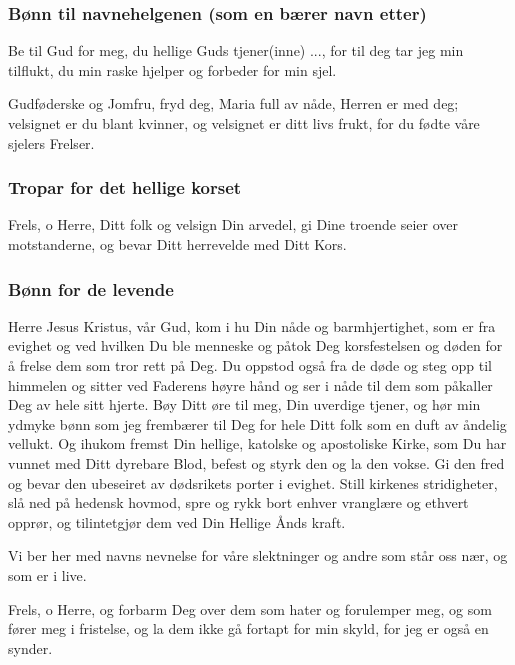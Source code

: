 \subsubsection{Bønn til navnehelgenen (som en bærer navn etter)}

Be til Gud for meg, du hellige Guds tjener(inne) ..., for til deg tar jeg min tilflukt, du min raske hjelper og forbeder for min sjel. 

Gudføderske og Jomfru, fryd deg, Maria full av nåde, Herren er med deg; velsignet er du blant kvinner, og velsignet er ditt livs frukt, for du fødte våre sjelers Frelser.

\subsubsection{Tropar for det hellige korset}

Frels, o Herre, Ditt folk og velsign Din arvedel, gi Dine troende seier over motstanderne, og bevar Ditt herrevelde med Ditt Kors.

\subsubsection{Bønn for de levende}

Herre Jesus Kristus, vår Gud, kom i hu Din nåde og barmhjertighet, som er fra evighet og ved hvilken Du ble menneske og påtok Deg korsfestelsen og døden for å frelse dem som tror rett på Deg. Du oppstod også fra de døde og steg opp til himmelen og sitter ved Faderens høyre hånd og ser i nåde til dem som påkaller Deg av hele sitt hjerte. Bøy Ditt øre til meg, Din uverdige tjener, og hør min ydmyke bønn som jeg frembærer til Deg for hele Ditt folk som en duft av åndelig vellukt. Og ihukom fremst Din hellige, katolske og apostoliske Kirke, som Du har vunnet med Ditt dyrebare Blod, befest og styrk den og la den vokse. Gi den fred og bevar den ubeseiret av dødsrikets porter i evighet. Still kirkenes stridigheter, slå ned på hedensk hovmod, spre og rykk bort enhver vranglære og ethvert opprør, og tilintetgjør dem ved Din Hellige Ånds kraft. 

\begin{forklaring}
Vi ber her med navns nevnelse for våre slektninger og andre som står oss nær, og som er i live. 
\end{forklaring}

Frels, o Herre, og forbarm Deg over dem som hater og forulemper meg, og som fører meg i fristelse, og la dem ikke gå fortapt for min skyld, for jeg er også en synder. 

